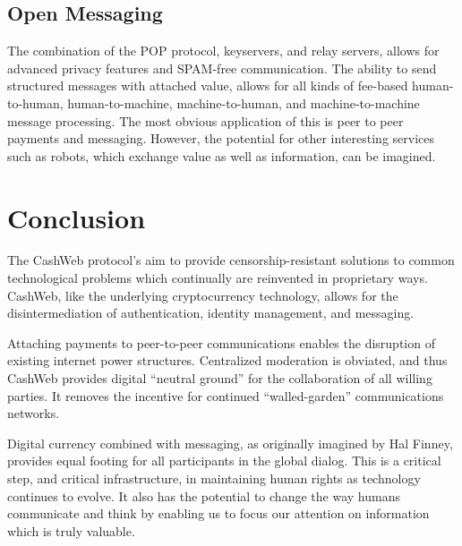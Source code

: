 \documentclass{article}
\begin{document}
\subsection{Open Messaging}

The combination of the POP protocol, keyservers, and relay servers, allows for advanced privacy features and SPAM-free communication. The ability to send structured messages with attached value, allows for all kinds of fee-based human-to-human, human-to-machine, machine-to-human, and machine-to-machine message processing. The most obvious application of this is peer to peer payments and messaging. However, the potential for other interesting services such as robots, which exchange value as well as information, can be imagined.

\section{Conclusion}

The CashWeb protocol's aim to provide censorship-resistant solutions to common technological problems which continually are reinvented in proprietary ways. CashWeb, like the underlying cryptocurrency technology, allows for the disintermediation of authentication, identity management, and messaging.

Attaching payments to peer-to-peer communications enables the disruption of existing internet power structures. Centralized moderation is obviated, and thus CashWeb provides digital ``neutral ground'' for the collaboration of all willing parties. It removes the incentive for continued ``walled-garden'' communications networks.

Digital currency combined with messaging, as originally imagined by Hal Finney\cite{finney2004rpow}, provides equal footing for all participants in the global dialog. This is a critical step, and critical infrastructure, in maintaining human rights as technology continues to evolve. It also has the potential to change the way humans communicate and think by enabling us to focus our attention on information which is truly valuable.



\end{document}
